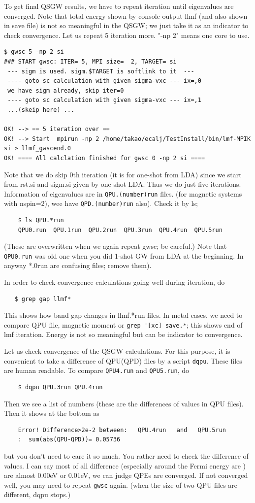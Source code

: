 \documentclass[a4paper,10pt,epsf,fleqn]{article}
\begin{document}
To get final QSGW results, we have to repeat iteration 
until eigenvalues are converged.
Note that total energy shown by console output llmf (and also shown in
save file) is not so meaningful in the QSGW; we just take it as an indicator to check convergence. 
Let us repeat 5 iteration more. "-np 2" means one core to use.
\begin{verbatim}
$ gwsc 5 -np 2 si
### START gwsc: ITER= 5, MPI size=  2, TARGET= si
 --- sigm is used. sigm.$TARGET is softlink to it  ---
 ---- goto sc calculation with given sigma-vxc --- ix=,0
 we have sigm already, skip iter=0
 ---- goto sc calculation with given sigma-vxc --- ix=,1
 ...(skeip here) ...

OK! --> == 5 iteration over ==
OK! --> Start  mpirun -np 2 /home/takao/ecalj/TestInstall/bin/lmf-MPIK  si > llmf_gwscend.0 
OK! ==== All calclation finished for gwsc 0 -np 2 si ====
\end{verbatim}
Note that we do skip 0th iteration (it is for one-shot from LDA) since
we start from rst.si and sigm.si given by one-shot LDA.
Thus we do just five iterations.
Information of eigenvalues are in \verb+QPU.(number)run+ files.
(for magnetic systems with nspin=2), wee have \verb+QPD.(number)run+ also).
Check it by ls;
\begin{verbatim}
    $ ls QPU.*run
    QPU0.run  QPU.1run  QPU.2run  QPU.3run  QPU.4run  QPU.5run
\end{verbatim}
(These are overwritten when we again repeat gwsc; be careful.)
Note that \verb+QPU0.run+ was old one when you did 1-shot GW from LDA 
at the beginning. In anyway *.0run are confusing files; remove them).

In order to check convergence calculations going well during iteration, do
\begin{verbatim}
   $ grep gap llmf*
\end{verbatim}
This shows how band gap changes in llmf.*run files.
In metal cases, we need to compare QPU file, magnetic moment or
\verb+grep '[xc] save.*+; this shows end of lmf iteration.
Energy is not so meaningful but can be indicator to convergence.

Let us check convergence of the QSGW calculations.
For this purpose, it is convenient to take a difference of QPU(QPD) files
by a script \verb+dqpu+. These files are human readable.
To compare \verb+QPU4.run+ and \verb+QPU5.run+, do
\begin{verbatim}
    $ dqpu QPU.3run QPU.4run
\end{verbatim}
Then we see a list of numbers (these are the differences of values in
QPU files).  Then it shows at the bottom as
\begin{verbatim}
    Error! Difference>2e-2 between:   QPU.4run   and   QPU.5run  
    :  sum(abs(QPU-QPD))= 0.05736
\end{verbatim}
but you don't need to care it so much.
You rather need to check the difference of values.
I can say most of all difference (especially around the Fermi energy are
) are almost 0.00eV or 0.01eV, we can judge QPEs are converged.
If not converged well, you may need to repeat 
\verb+gwsc+ again.
(when the size of two QPU files are different, dqpu stops.)
\end{document}
